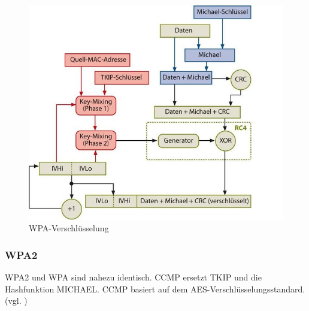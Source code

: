 \begin{figure} [htb]
\begin{centering}
\includegraphics[scale=0.6]{Bilder/Kapitel2/wpa_funktionsweise.jpg}
\caption[WPA-Verschlüsselung]{WPA-Verschlüsselung \cite{Heise-WLAN}}
\label{wpa_funktionsweise}
\end{centering}
\end{figure}
\subsubsection{\ac{WPA2}}
\ac{WPA2} und \ac{WPA} sind nahezu identisch. \ac{CCMP} ersetzt \ac{TKIP} und die Hashfunktion MICHAEL. \ac{CCMP} basiert auf dem \ac{AES}-Verschlüsselungsstandard. (vgl. \cite{WPA2})
